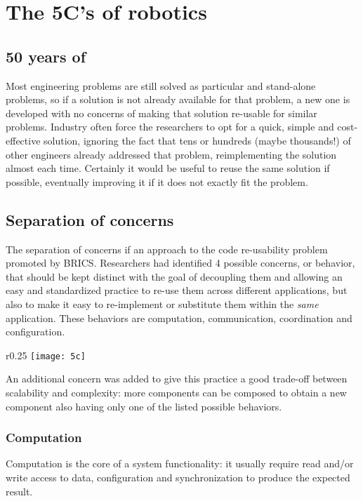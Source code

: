 \chapter{The 5C's of robotics}

\label{ch:introduction} 
\section{50 years of }
Most engineering problems are still solved as particular and stand-alone problems, so if a solution is not already available for that problem, a new one is developed with no concerns of making that solution re-usable for similar problems. Industry often force the researchers to opt for a quick, simple and cost-effective solution, ignoring the fact that tens or hundreds (maybe thousands!) of other engineers already addressed that problem, reimplementing the solution almost each time. Certainly it would be useful to reuse the same solution if possible, eventually improving it if it does not exactly fit the problem.
\section{Separation of concerns}
The separation of concerns if an approach to the code re-usability problem promoted by BRICS. Researchers had identified 4 possible concerns, or behavior, that should be kept distinct with the goal of decoupling them and allowing an easy and standardized practice to re-use them across different applications, but also to make it easy to re-implement or substitute them within the \emph{same} application. These behaviors are computation, communication, coordination and configuration\cite{brics}.
\begin{wrapfigure}{r}{0.25\textwidth} %
	\label{fig:fivec}
	\centering
	\texttt{[image: 5c]}
\end{wrapfigure}
An additional concern was added to give this practice a good trade-off between scalability and complexity: more components can be composed to obtain a new component also having only one of the listed possible behaviors.
\subsection{Computation}
Computation is the core of a system functionality: it usually require read and/or write access to data, configuration and synchronization to produce the expected result.
